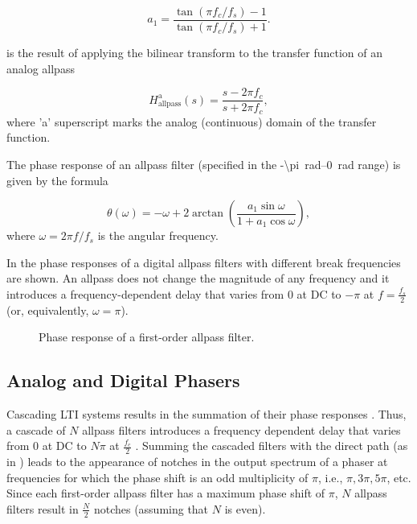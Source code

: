 \begin{equation}
    a_1 = \frac{\tan (\pi f_c / f_s) - 1}{\tan(\pi f_c / f_s) + 1}.
    \label{eq:allpass_coefficient}
\end{equation}

 is the result of applying the bilinear transform to the transfer function of an analog allpass

\begin{equation}
    H_{\text{allpass}}^{\text{a}} (s) = \frac{s - 2\pi f_c}{s + 2\pi f_c},
\end{equation}
where 'a' superscript marks the analog (continuous) domain of the transfer function.

The phase response of an allpass filter (specified in the \SIrange{-\pi}{0}{rad} range) is given by the formula \cite{Kiiski2016}

\begin{equation}
    \theta (\omega) = - \omega + 2 \arctan \left( \frac{a_1 \sin \omega}{1 + a_1 \cos \omega} \right),
\end{equation}
where $\omega = 2 \pi f / f_s$ is the angular frequency.

In  the phase responses of a digital allpass filters with different break frequencies are shown. An allpass does not change the magnitude of any frequency and it introduces a frequency-dependent delay that varies from 0 at DC to $-\pi$ at $f = \frac{f_s}{2}$ (or, equivalently, $\omega = \pi$). 

\begin{figure}
    \centering
    
    \caption{Phase response of a first-order allpass filter.}
    \label{fig:phase_response_allpass_filter}
\end{figure}

\subsection{Analog and Digital Phasers}

Cascading \ac{LTI} systems results in the summation of their phase responses \cite{Oppenheim1997}. Thus, a cascade of $N$ allpass filters introduces a frequency dependent delay that varies from 0 at DC to $N\pi$ at $\frac{f_c}{2}$ \cite{PASPWEB2010}. Summing the cascaded filters with the direct path (as in ) leads to the appearance of notches in the output spectrum of a phaser at frequencies for which the phase shift is an odd multiplicity of $\pi$, i.e., $\pi, 3\pi, 5\pi$, etc. Since each first-order allpass filter has a maximum phase shift of $\pi$, $N$ allpass filters result in $\frac{N}{2}$ notches (assuming that $N$ is even).

